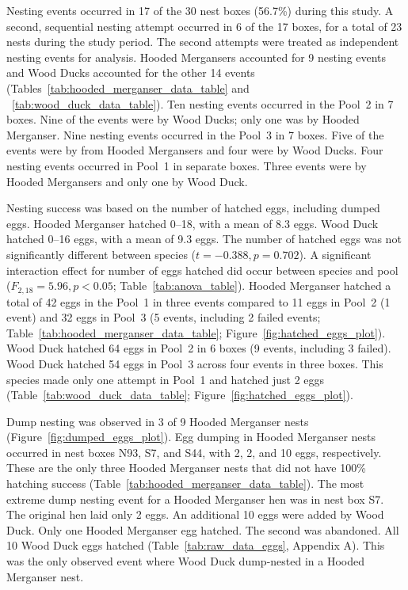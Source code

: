 Nesting events occurred in 17 of the 30 nest boxes (56.7\%) during this study. A second, sequential nesting attempt occurred in 6 of the 17 boxes, for a total of 23 nests during the study period. The second attempts were treated as independent nesting events for analysis. 
Hooded Mergansers accounted for 9 nesting events and Wood Ducks accounted for the other 14 events (Tables~\ref{tab:hooded_merganser_data_table} and ~\ref{tab:wood_duck_data_table}).  Ten nesting events occurred in the Pool~2 in 7 boxes. Nine of the events were by Wood Ducks; only one was by Hooded Merganser. Nine nesting events occurred in the Pool~3 in 7 boxes. Five of the events were by from Hooded Mergansers and four were by Wood Ducks. Four nesting events occurred in Pool~1 in separate boxes. Three events were by Hooded Mergansers and only one by Wood Duck. %





Nesting success was based on the number of hatched eggs, including dumped eggs. Hooded Merganser hatched \numrange[range-phrase = –]{0}{18}, with a mean of \num{8.3} eggs. Wood Duck hatched \numrange[range-phrase = –]{0}{16} eggs, with a mean of \num{9.3} eggs. The number of hatched eggs was not significantly different between species ($t = -0.388, p = 0.702$). A significant interaction effect for number of eggs hatched did occur between species and pool ($F_{2,18} = 5.96, p < 0.05$; Table~\ref{tab:anova_table}). Hooded Merganser hatched a total of 42 eggs in the Pool~1 in three events compared to 11 eggs in Pool~2  (1 event) and 32 eggs in Pool~3 (5 events, including 2 failed events; Table~\ref{tab:hooded_merganser_data_table}; Figure~\ref{fig:hatched_eggs_plot}). Wood Duck hatched 64 eggs in Pool~2 in 6 boxes (9 events, including 3 failed). %
Wood Duck hatched 54 eggs in Pool~3 across four events in three boxes. This species made only one attempt in Pool~1 and hatched just 2 eggs (Table~\ref{tab:wood_duck_data_table}; Figure~\ref{fig:hatched_eggs_plot}). 



 

Dump nesting was observed in 3 of 9 Hooded Merganser nests (Figure~\ref{fig:dumped_eggs_plot}). Egg dumping in Hooded Merganser nests occurred in nest boxes N93, S7, and S44, with 2, 2, and 10 eggs, respectively. These are the only three Hooded Merganser nests that did not have 100\% hatching success (Table~\ref{tab:hooded_merganser_data_table}). The most extreme dump nesting event for a Hooded Merganser hen was in nest box S7. The original hen laid only 2 eggs. An additional 10 eggs were added by Wood Duck. Only one Hooded Merganser egg hatched. The second was abandoned. All 10 Wood Duck eggs hatched (Table~\ref{tab:raw_data_eggs}, Appendix A). This was the only observed event where Wood Duck dump-nested in a Hooded Merganser nest.


